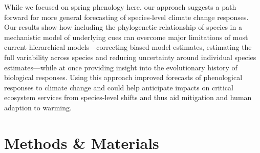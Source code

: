 \documentclass[11pt]{article}
\begin{document}
While we focused on spring phenology here, our approach suggests a path forward for more general forecasting of species-level climate change responses. Our results show how including the phylogenetic relationship of species in a mechanistic model of underlying cues can overcome major limitations of most current hierarchical models---correcting biased model estimates, estimating the full variability across species and reducing uncertainty around individual species estimates---while at once providing insight into the evolutionary history of biological responses. Using this approach improved forecasts of phenological responses to climate change and could help anticipate impacts on critical ecosystem services from species-level shifts and thus aid mitigation and human adaption to warming. %




\clearpage
\section*{Methods \& Materials} 

\end{document}
